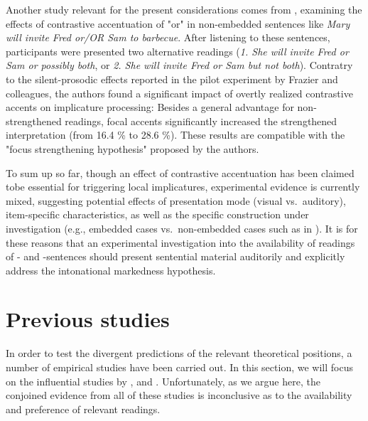 \documentclass[fleqn,reqno,10pt,draft]{article}
\newcommand{\as}{\acro{as}}
\renewcommand{\es}{\acro{es}}
\begin{document}
Another study relevant for the present considerations comes from
\citet{SchwarzClifton2008:Strengthening-o}, examining the effects of
contrastive accentuation of "or" in non-embedded sentences like {\it
  Mary will invite Fred or/OR Sam to barbecue}. After listening to
these sentences, participants were presented two alternative readings
({\it 1. She will invite Fred or Sam or possibly both}, or {\it 2.
  She will invite Fred or Sam but not both}). Contratry to the
silent-prosodic effects reported in the pilot experiment by Frazier
and colleagues, the authors found a significant impact of overtly
realized contrastive accents on implicature processing: Besides a
general advantage for non-strengthened readings, focal accents
significantly increased the strengthened interpretation (from 16.4 \%
to 28.6 \%). These results are compatible with the "focus
strengthening hypothesis" proposed by the authors.

To sum up so far, though an effect of contrastive accentuation has
been claimed tobe essential for triggering local implicatures,
experimental evidence is currently mixed, suggesting potential effects
of presentation mode (visual vs.~auditory), item-specific
characteristics, as well as the specific construction under
investigation (e.g., embedded cases vs.~non-embedded cases such as in
\citet{SchwarzClifton2008:Strengthening-o}). It is for these reasons
that an experimental investigation into the availability of readings
of \as- and \es-sentences should present sentential material
auditorily and explicitly address the intonational markedness
hypothesis. 

\section{Previous studies}
\label{sec:previous-studies}

In order to test the divergent predictions of the relevant theoretical
positions, a number of empirical studies have been carried out. In
this section, we will focus on the influential studies by
\citet{GeurtsPouscoulous2009:Embedded-Implic},
\citet{CliftonDube2010:Embedded-Implic} and
\citet{ChemlaSpector2010:Experimental-Ev}. Unfortunately, as we argue
here, the conjoined evidence from all of these studies is inconclusive
as to the availability and preference of relevant readings.

\subsection{\citet{GeurtsPouscoulous2009:Embedded-Implic}}
\label{sec:Geurts-and-Pouscoulous}
\end{document}
